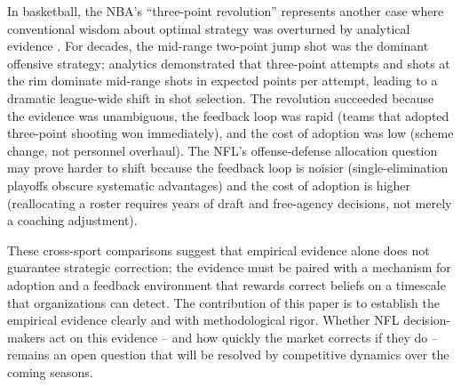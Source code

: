 In basketball, the NBA's ``three-point revolution'' represents another case where conventional wisdom about optimal strategy was overturned by analytical evidence \parencite{goldsberry2019sprawlball}. For decades, the mid-range two-point jump shot was the dominant offensive strategy; analytics demonstrated that three-point attempts and shots at the rim dominate mid-range shots in expected points per attempt, leading to a dramatic league-wide shift in shot selection. The revolution succeeded because the evidence was unambiguous, the feedback loop was rapid (teams that adopted three-point shooting won immediately), and the cost of adoption was low (scheme change, not personnel overhaul). The NFL's offense-defense allocation question may prove harder to shift because the feedback loop is noisier (single-elimination playoffs obscure systematic advantages) and the cost of adoption is higher (reallocating a roster requires years of draft and free-agency decisions, not merely a coaching adjustment).

These cross-sport comparisons suggest that empirical evidence alone does not guarantee strategic correction; the evidence must be paired with a mechanism for adoption and a feedback environment that rewards correct beliefs on a timescale that organizations can detect. The contribution of this paper is to establish the empirical evidence clearly and with methodological rigor. Whether NFL decision-makers act on this evidence  -- and how quickly the market corrects if they do  -- remains an open question that will be resolved by competitive dynamics over the coming seasons.
